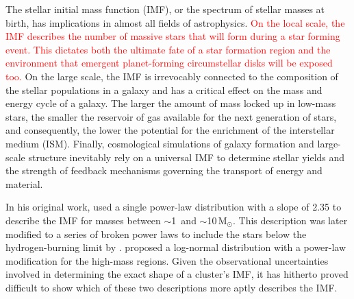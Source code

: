 \documentclass[referee]{aa}
\newcommand{\msune}{M$_\odot$}
\newcommand{\s}{$\sim$}
\newcommand{\langedit}[1]{\textcolor{red}{#1}}
\begin{document}
The stellar initial mass function (IMF), or the spectrum of stellar masses at birth, has implications in almost all fields of astrophysics.
\langedit{On the local scale, the IMF describes the number of massive stars that will form during a star forming event.
This dictates both the ultimate fate of a star formation region and the environment that emergent planet-forming circumstellar disks will be exposed too.}
On the large scale, the IMF is irrevocably connected to the composition of the stellar populations in a galaxy and has a critical effect on the mass and energy cycle of a galaxy.
The larger the amount of mass locked up in low-mass stars, the smaller the reservoir of gas available for the next generation of stars, and consequently, the lower the potential for the enrichment of the interstellar medium (ISM).
Finally, cosmological simulations of galaxy formation and large-scale structure inevitably rely on a universal IMF to determine stellar yields and the strength of feedback mechanisms governing the transport of energy and material.

In his original work, \citet{salpeter1955} used a single power-law distribution with a slope of 2.35 to describe the IMF for masses between \s1\ and \s10\,\msune.
This description was later modified to a series of broken power laws to include the stars below the hydrogen-burning limit by \citet{kroupa2001}\@.
\citet{chabrier2003, Chabrier2005} proposed a log-normal distribution with a power-law modification for the high-mass regions.
Given the observational uncertainties involved in determining the exact shape of a cluster's IMF, it has hitherto proved difficult to show which of these two descriptions more aptly describes the IMF\@.
\end{document}
